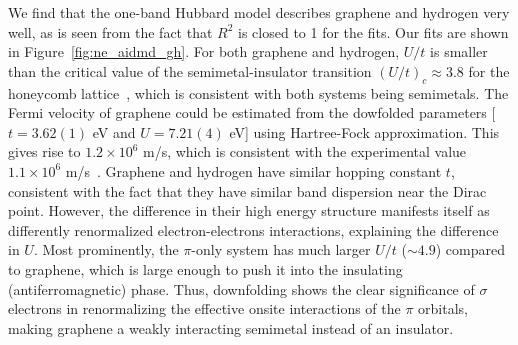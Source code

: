 We find that the one-band Hubbard model describes graphene and hydrogen very well, as is seen from the fact that $R^2$ is closed to 1 for the fits. Our fits are shown in Figure~\ref{fig:ne_aidmd_gh}.
For both graphene and hydrogen, $U/t$ is smaller than the critical value of the 
semimetal-insulator transition $(U/t)_c \approx 3.8$ for the honeycomb lattice~\cite{Sorella2012}, 
which is consistent with both systems being semimetals. The Fermi velocity of graphene could be estimated from the dowfolded parameters [$t=3.62(1)$ eV and $U=7.21(4)$ eV] using Hartree-Fock approximation.  
This gives rise to  $1.2\times 10^{6}$ m/s, which is consistent with the experimental value $1.1 \times 10^6$ m/s~\cite{Siegel2011}. 
Graphene and hydrogen have similar hopping constant $t$, 
consistent with the fact that they have similar band dispersion near the Dirac point. 
However, the difference in their high energy structure manifests itself as differently renormalized electron-electrons interactions, 
explaining the difference in $U$. Most prominently, the $\pi$-only system has much larger $U/t$ ($\sim4.9$) compared to graphene, 
which is large enough to push it into the insulating (antiferromagnetic) phase.
Thus, downfolding shows the clear significance of $\sigma$ electrons in renormalizing the effective onsite interactions of the $\pi$ orbitals, making graphene a weakly interacting semimetal instead of an insulator.  

